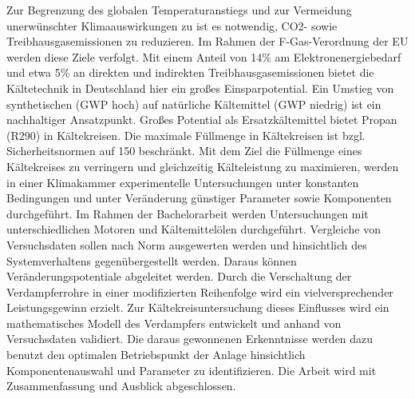 Zur Begrenzung des globalen Temperaturanstiegs und zur Vermeidung unerwünschter Klimaauswirkungen zu ist es notwendig, CO2- sowie Treibhausgasemissionen zu reduzieren. Im Rahmen der F-Gas-Verordnung der EU werden diese Ziele verfolgt. Mit einem Anteil von \unit{14}{\%}  am Elektronenergiebedarf und etwa \unit{5}{\%} an direkten und indirekten Treibhausgasemissionen bietet die Kältetechnik in Deutschland hier ein großes Einsparpotential. Ein Umstieg von synthetischen (GWP hoch) auf natürliche Kältemittel (GWP niedrig) ist ein nachhaltiger Ansatzpunkt. 
Großes Potential als Ersatzkältemittel bietet  Propan (R290) in Kältekreisen. Die maximale Füllmenge in Kältekreisen ist bzgl. Sicherheitsnormen auf \unit{150}{\gram} beschränkt. 
Mit dem Ziel die Füllmenge eines Kältekreises zu verringern und gleichzeitig Kälteleistung zu maximieren, werden in einer Klimakammer experimentelle Untersuchungen unter konstanten Bedingungen und unter Veränderung günstiger Parameter sowie Komponenten durchgeführt.
Im Rahmen der Bachelorarbeit werden Untersuchungen mit unterschiedlichen Motoren und Kältemittelölen durchgeführt. Vergleiche von Versuchsdaten sollen nach Norm ausgewerten werden und hinsichtlich des Systemverhaltens gegenübergestellt werden. Daraus können Veränderungspotentiale abgeleitet werden.
Durch die Verschaltung der Verdampferrohre in einer modifizierten Reihenfolge wird ein vielversprechender Leistungsgewinn erzielt. Zur Kältekreisuntersuchung dieses Einflusses wird ein mathematisches Modell des Verdampfers entwickelt und anhand von Versuchsdaten validiert.
Die daraus gewonnenen Erkenntnisse werden dazu benutzt den optimalen Betriebspunkt der Anlage hinsichtlich Komponentenauswahl und Parameter zu identifizieren.
Die Arbeit wird mit Zusammenfassung und Ausblick abgeschlossen.
